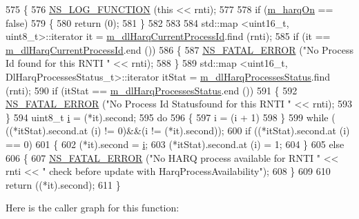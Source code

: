 \begin{DoxyCode}
575 \{
576   \hyperlink{log-macros-disabled_8h_a90b90d5bad1f39cb1b64923ea94c0761}{NS\_LOG\_FUNCTION} (\textcolor{keyword}{this} << rnti);
577 
578   \textcolor{keywordflow}{if} (\hyperlink{classns3_1_1PfFfMacScheduler_a20ee9882187d440870b2a88b63fcb7e9}{m\_harqOn} == \textcolor{keyword}{false})
579     \{
580       \textcolor{keywordflow}{return} (0);
581     \}
582 
583 
584   std::map <uint16\_t, uint8\_t>::iterator it = \hyperlink{classns3_1_1PfFfMacScheduler_a792f015651334a9e688d534367f29155}{m\_dlHarqCurrentProcessId}.find (rnti);
585   \textcolor{keywordflow}{if} (it == \hyperlink{classns3_1_1PfFfMacScheduler_a792f015651334a9e688d534367f29155}{m\_dlHarqCurrentProcessId}.end ())
586     \{
587       \hyperlink{group__fatal_ga5131d5e3f75d7d4cbfd706ac456fdc85}{NS\_FATAL\_ERROR} (\textcolor{stringliteral}{"No Process Id found for this RNTI "} << rnti);
588     \}
589   std::map <uint16\_t, DlHarqProcessesStatus\_t>::iterator itStat = 
      \hyperlink{classns3_1_1PfFfMacScheduler_a438c2319e01eaac65f64cbd82b3e8089}{m\_dlHarqProcessesStatus}.find (rnti);
590   \textcolor{keywordflow}{if} (itStat == \hyperlink{classns3_1_1PfFfMacScheduler_a438c2319e01eaac65f64cbd82b3e8089}{m\_dlHarqProcessesStatus}.end ())
591     \{
592       \hyperlink{group__fatal_ga5131d5e3f75d7d4cbfd706ac456fdc85}{NS\_FATAL\_ERROR} (\textcolor{stringliteral}{"No Process Id Statusfound for this RNTI "} << rnti);
593     \}
594   uint8\_t \hyperlink{bernuolliDistribution_8m_a6f6ccfcf58b31cb6412107d9d5281426}{i} = (*it).second;
595   \textcolor{keywordflow}{do}
596     \{
597       i = (i + 1) %
598     \}
599   \textcolor{keywordflow}{while} ( ((*itStat).second.at (i) != 0)&&(i != (*it).second));
600   \textcolor{keywordflow}{if} ((*itStat).second.at (i) == 0)
601     \{
602       (*it).second = \hyperlink{bernuolliDistribution_8m_a6f6ccfcf58b31cb6412107d9d5281426}{i};
603       (*itStat).second.at (i) = 1;
604     \}
605   \textcolor{keywordflow}{else}
606     \{
607       \hyperlink{group__fatal_ga5131d5e3f75d7d4cbfd706ac456fdc85}{NS\_FATAL\_ERROR} (\textcolor{stringliteral}{"No HARQ process available for RNTI "} << rnti << \textcolor{stringliteral}{" check before update
       with HarqProcessAvailability"});
608     \}
609 
610   \textcolor{keywordflow}{return} ((*it).second);
611 \}
\end{DoxyCode}


Here is the caller graph for this function\+:


